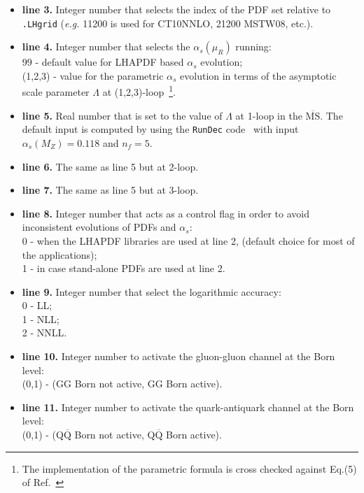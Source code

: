 \documentclass[11pt]{article}
\begin{document}
{\begin{itemize}
\item {\bf line 3.} Integer number that selects the index of the PDF set relative to \texttt{.LHgrid} ({\it e.g.}  11200 is used for CT10NNLO, 21200 MSTW08, etc.).



\item {\bf line 4.} Integer number that selects the $\alpha_s(\mu_R)$ running:
\\
99 - default value for LHAPDF based $\alpha_s$ evolution;
\\
(1,2,3) - value for the parametric $\alpha_s$ evolution in terms of the 
asymptotic scale parameter $\Lambda$ at (1,2,3)-loop~\footnote{The implementation of the parametric formula 
is cross checked against Eq.(5) of Ref.~\cite{Chetyrkin:2000yt}}.



\item {\bf line 5.} Real number that is set to the value of $\Lambda$ at 1-loop in the $\overline{\textrm{MS}}$. 
The default input is computed by using the \texttt{RunDec} code~\cite{Chetyrkin:2000yt} with input $\alpha_s(M_Z)=0.118$ and $n_f=5$.  


\item {\bf line 6.} The same as line 5 but at 2-loop. 


\item {\bf line 7.} The same as line 5 but at 3-loop.


\item {\bf line 8.} Integer number that acts as a control flag in order to avoid 
inconsistent evolutions of PDFs and $\alpha_s$: 
\\
0 - when the LHAPDF libraries are used at line 2, (default choice for most of the applications);   
\\
1 - in case stand-alone PDFs are used at line 2. 



\item {\bf line 9.} Integer number that select the logarithmic accuracy:
\\
0 - LL;
\\
1 - NLL;
\\
2 - NNLL.

\item {\bf line 10.} Integer number to activate the gluon-gluon channel at the Born level:
\\
(0,1) - (GG Born not active, GG Born active).
 
\item {\bf line 11.} Integer number to activate the quark-antiquark channel at the Born level:
\\
(0,1) - (Q$\overline{\textrm{Q}}$ Born not active, Q$\overline{\textrm{Q}}$ Born active).


\end{itemize}}
\end{document}
